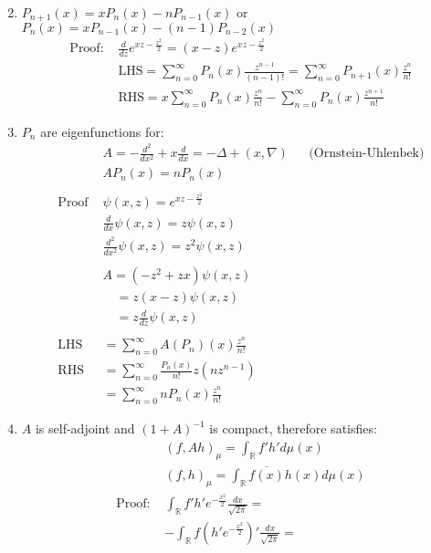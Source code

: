 \documentclass[12pt, a4paper]{article}
\begin{document}
\begin{enumerate}
\begin{align*}
    \end{align*}
    \item $P_{n+1}(x) = xP_n(x) - nP_{n-1}(x)$ or $P_n(x) = xP_{n-1}(x) - (n-1)P_{n-2}(x)$
    \begin{align*}
        \text{Proof: }&\frac{d}{dz}e^{xz - \frac{z^2}{2}} = (x-z)e^{xz - \frac{z^2}{2}}\\
        &\text{LHS}=\sum_{n=0}^\infty P_n(x)\frac{z^{n-1}}{(n-1)!} = \sum_{n=0}^\infty P_{n+1}(x)\frac{z^{n}}{n!}\\
        &\text{RHS}=x\sum_{n=0}^\infty P_n(x)\frac{z^{n}}{n!} - \sum_{n=0}^\infty P_n(x)\frac{z^{n+1}}{n!}
    \end{align*}
    \item $P_n$ are eigenfunctions for:
    \begin{align*}
        &A = -\frac{d^2}{dx^2}+x\frac{d}{dx} = -\Delta + (x, \nabla)&&\text{(Ornstein-Uhlenbek)}\\
        &AP_n(x) = nP_n(x)\\\\
        \text{Proof }&\psi(x, z) = e^{xz - \frac{z^2}{2}}\\
        &\frac{d}{dx} \psi(x, z) = z\psi(x, z)\\
        &\frac{d^2}{dx^2}\psi(x, z) = z^2\psi(x, z)\\\\
        &A = (-z^2+zx)\psi(x, z)\\
        &\quad= z(x-z)\psi(x, z)\\
        &\quad=z\frac{d}{dz}\psi(x, z)\\\\
        \text{LHS }&=\sum_{n=0}^\infty A(P_n)(x)\frac{z^n}{n!}\\
        \text{RHS }&=\sum_{n=0}^\infty \frac{P_n(x)}{n!}z(nz^{n-1})\\
        &=\sum_{n=0}^\infty nP_n(x)\frac{z^n}{n!}
    \end{align*}
    \item $A$ is self-adjoint and $(1+A)^{-1}$ is compact, therefore satisfies:
    \begin{align*}
        &(f, Ah)_\mu = \int_\mathbb{R}f'h'd\mu(x)\\
        &(f, h)_\mu = \int_\mathbb{R}\overline{f(x)}h(x)d\mu(x)\\
        \text{Proof: }&\int_\mathbb{R}f'h'e^{-\frac{x^2}{2}}\frac{dx}{\sqrt{2\pi}}=\\
        &-\int_\mathbb{R}f(h'e^{-\frac{x^2}{2}})'\frac{dx}{\sqrt{2\pi}}=\\

\end{align*}
\end{enumerate}
\end{document}
